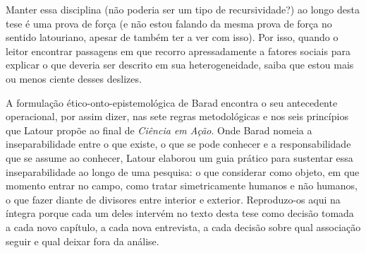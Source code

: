 Manter essa disciplina (não poderia ser um tipo de recursividade?) ao longo desta tese é uma prova de força (e não estou falando da mesma prova de força no sentido latouriano, apesar de também ter a ver com isso). Por isso, quando o leitor encontrar passagens em que recorro apressadamente a fatores sociais para explicar o que deveria ser descrito em sua heterogeneidade, saiba que estou mais ou menos ciente desses deslizes. 

A formulação ético-onto-epistemológica de Barad encontra o seu antecedente operacional, por assim dizer, nas sete regras metodológicas e nos seis princípios que Latour propõe ao final de \textit{Ciência em Ação}. Onde Barad nomeia a inseparabilidade entre o que existe, o que se pode conhecer e a responsabilidade que se assume ao conhecer, Latour elaborou um guia prático para sustentar essa inseparabilidade ao longo de uma pesquisa: o que considerar como objeto, em que momento entrar no campo, como tratar simetricamente humanos e não humanos, o que fazer diante de divisores entre interior e exterior. Reproduzo-os aqui na íntegra porque cada um deles intervém no texto desta tese como decisão tomada a cada novo capítulo, a cada nova entrevista, a cada decisão sobre qual associação seguir e qual deixar fora da análise.

